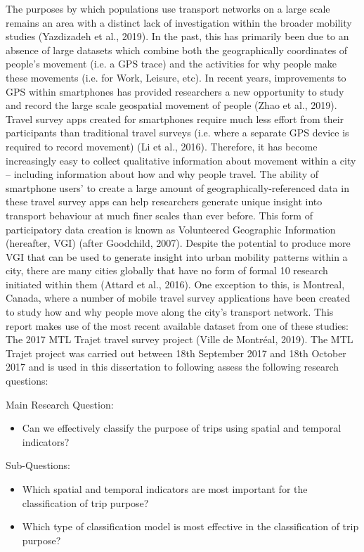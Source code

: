 The purposes by which populations use transport networks on a large scale remains an area with a distinct lack of investigation within the broader mobility studies (Yazdizadeh et al., 2019). In the past, this has primarily been due to an absence of large datasets which combine both the geographically coordinates of people’s movement (i.e. a GPS trace) and the activities for why people make these movements (i.e. for Work, Leisure, etc).
In recent years, improvements to GPS within smartphones has provided researchers a new opportunity to study and record the large scale geospatial movement of people (Zhao et al., 2019). Travel survey apps created for smartphones require much less effort from their participants than traditional travel surveys (i.e. where a separate GPS device is required to record movement) (Li et al., 2016). Therefore, it has become increasingly easy to collect qualitative information about movement within a city – including information about how and why people travel.
The ability of smartphone users’ to create a large amount of geographically-referenced data in these travel survey apps can help researchers generate unique insight into transport behaviour at much finer scales than ever before. This form of participatory data creation is known as Volunteered Geographic Information (hereafter, VGI) (after Goodchild, 2007).
Despite the potential to produce more VGI that can be used to generate insight into urban mobility patterns within a city, there are many cities globally that have no form of formal
10
research initiated within them (Attard et al., 2016). One exception to this, is Montreal, Canada, where a number of mobile travel survey applications have been created to study how and why people move along the city’s transport network. This report makes use of the most recent available dataset from one of these studies: The 2017 MTL Trajet travel survey project (Ville de Montr\'eal, 2019). The MTL Trajet project was carried out between 18th September 2017 and 18th October 2017 and is used in this dissertation to following assess the following research questions:

  Main Research Question:
 \begin{itemize}
  \item Can we effectively classify the purpose of trips using spatial and temporal indicators?
\end{itemize}
  
  Sub-Questions:
\begin{itemize}
  \item Which spatial and temporal indicators are most important for the classification of trip purpose?
  \item Which type of classification model is most effective in the classification of trip purpose?
\end{itemize}
	
